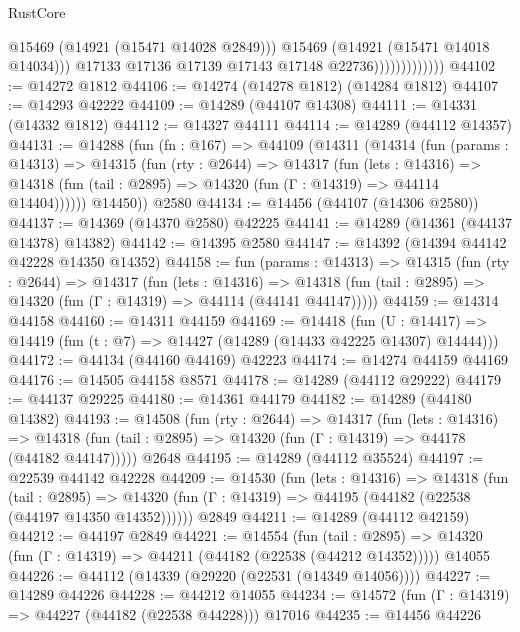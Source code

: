 \begin{lexlean}{RustCore}
\begin{coremodule}
                                  @15469
                                  (@14921 (@15471 @14028 @2849)))
                                @15469
                                (@14921 (@15471 @14018 @14034)))
                              @17133
                              @17136
                              @17139
                              @17143
                              @17148
                              @22736)))))))))))))
@44102 := @14272 @1812
@44106 := @14274 (@14278 @1812) (@14284 @1812)
@44107 := @14293 @42222
@44109 := @14289 (@44107 @14308)
@44111 := @14331 (@14332 @1812)
@44112 := @14327 @44111
@44114 := @14289 (@44112 @14357)
@44131 := @14288
    (fun (fn : @167) =>
    @44109
      (@14311
        (@14314
          (fun (params : @14313) =>
          @14315
            (fun (rty : @2644) =>
            @14317
              (fun (lets : @14316) =>
              @14318 (fun (tail : @2895) => @14320 (fun (Γ : @14319) => @44114 @14404))))))
        @14450))
    @2580
@44134 := @14456 (@44107 (@14306 @2580))
@44137 := @14369 (@14370 @2580) @42225
@44141 := @14289 (@14361 (@44137 @14378) @14382)
@44142 := @14395 @2580
@44147 := @14392 (@14394 @44142 @42228 @14350 @14352)
@44158 := fun (params : @14313) =>
  @14315
    (fun (rty : @2644) =>
    @14317
      (fun (lets : @14316) =>
      @14318 (fun (tail : @2895) => @14320 (fun (Γ : @14319) => @44114 (@44141 @44147)))))
@44159 := @14314 @44158
@44160 := @14311 @44159
@44169 := @14418
    (fun (U : @14417) => @14419 (fun (t : @7) => @14427 (@14289 (@14433 @42225 @14307) @14444)))
@44172 := @44134 (@44160 @44169) @42223
@44174 := @14274 @44159 @44169
@44176 := @14505 @44158 @8571
@44178 := @14289 (@44112 @29222)
@44179 := @44137 @29225
@44180 := @14361 @44179
@44182 := @14289 (@44180 @14382)
@44193 := @14508
    (fun (rty : @2644) =>
    @14317
      (fun (lets : @14316) =>
      @14318 (fun (tail : @2895) => @14320 (fun (Γ : @14319) => @44178 (@44182 @44147)))))
    @2648
@44195 := @14289 (@44112 @35524)
@44197 := @22539 @44142 @42228
@44209 := @14530
    (fun (lets : @14316) =>
    @14318
      (fun (tail : @2895) =>
      @14320 (fun (Γ : @14319) => @44195 (@44182 (@22538 (@44197 @14350 @14352))))))
    @2849
@44211 := @14289 (@44112 @42159)
@44212 := @44197 @2849
@44221 := @14554
    (fun (tail : @2895) => @14320 (fun (Γ : @14319) => @44211 (@44182 (@22538 (@44212 @14352)))))
    @14055
@44226 := @44112 (@14339 (@29220 (@22531 (@14349 @14056))))
@44227 := @14289 @44226
@44228 := @44212 @14055
@44234 := @14572 (fun (Γ : @14319) => @44227 (@44182 (@22538 @44228))) @17016
@44235 := @14456 @44226

\end{coremodule}
\end{lexlean}
